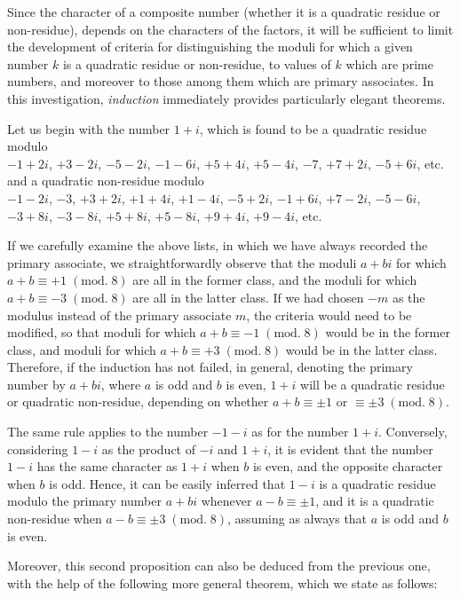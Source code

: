 \documentclass[twoside,12pt]{memoir}
\renewcommand{\pmod}[1]{\;(\textrm{mod.}\;#1)}
\begin{document}
Since the character of a composite number (whether it is a quadratic residue or non-residue), depends on the characters of the factors, it will be sufficient to limit the development of criteria for distinguishing the moduli for which a given number \(k\) is a quadratic residue or non-residue, to values of \(k\) which are prime numbers, and moreover to those among them which are primary associates. In this investigation, \textit{induction} immediately provides particularly elegant theorems.

Let us begin with the number \(1+i\), which is found to be a quadratic residue modulo\\
\(-1+2 i\), \(+3-2 i\), \(-5-2 i\), \(-1-6 i\), \(+5+4 i\), \(+5-4 i\), \(-7\), \(+7+2 i\), \(-5+6 i\), etc.\\
and a quadratic non-residue modulo\\
\(-1-2 i\), \(-3\), \(+3+2 i\), \(+1+4 i\), \(+1-4 i\), \(-5+2 i\), \(-1+6 i\), \(+7-2 i\), \(-5-6 i\), \(-3+8 i\), \(-3-8 i\), \(+5+8 i\), \(+5-8 i\), \(+9+4 i\), \(+9-4 i\), etc.

If we carefully examine the above lists, in which we have always recorded the primary associate, we straightforwardly observe that the moduli \(a+bi\) for which \(a+b \equiv +1 \pmod{8}\) are all in the former class, and the moduli for which \(a+b \equiv -3 \pmod{8}\) are all in the latter class. If we had chosen \(-m\) as the modulus instead of the primary associate \(m\), the criteria would need to be modified, so that moduli for which \(a+b \equiv -1\pmod{8}\) would be in the former class, and moduli for which \(a+b \equiv +3 \pmod{8}\) would be in the latter class. Therefore, if the induction has not failed, in general, denoting the primary number by \(a+bi\), where \(a\) is odd and \(b\) is even, \(1+i\) will be a quadratic residue or quadratic non-residue, depending on whether \(a+b \equiv \pm 1\) or \(\equiv \pm 3 \pmod{8}\).

The same rule applies to the number \(-1-i\) as for the number \(1+i\). Conversely, considering \(1-i\) as the product of \(-i\) and \(1+i\), it is evident that the number \(1-i\) has the same character as \(1+i\) when \(b\) is even, and the opposite character when \(b\) is odd. Hence, it can be easily inferred that \(1-i\) is a quadratic residue modulo the primary number \(a+b i\) whenever \(a-b \equiv \pm 1\), and it is a quadratic non-residue when \(a-b \equiv \pm 3\pmod{8}\), assuming as always that \(a\) is odd and \(b\) is even.

Moreover, this second proposition can also be deduced from the previous one, with the help of the following more general theorem, which we state as follows:\pagebreak%
\end{document}
